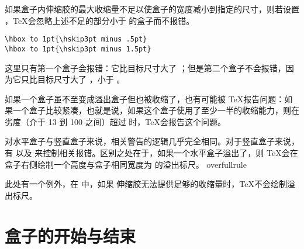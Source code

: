 \documentclass{book}
\begin{document}
\begin{example}
如果盒子内伸缩胶的最大收缩量不足以使盒子的宽度减小到指定的尺寸，则若设置 \emph{}，\TeX 会忽略上述不足的部分小于 \n{1pt} 的盒子而不报错。
\begin{verbatim}
\hbox to 1pt{\hskip3pt minus .5pt}
\hbox to 1pt{\hskip3pt minus 1.5pt}
\end{verbatim}
这里只有第一个盒子会报错：它比目标尺寸大了 \n{1.5pt}；但是第二个盒子不会报错，因为它只比目标尺寸大了 \n{0.5pt}，小于 \emph{}。
\end{example}

如果一个盒子虽不至变成溢出盒子但也被收缩了，也有可能被 \TeX 报告问题：如果一个盒子比较紧凑，也就是说，如果这个盒子使用了至少一半的收缩能力，则在劣度（介于 13 到 100 之间）超过  时，\TeX 会报告这个问题。

对水平盒子与竖直盒子来说，相关警告的逻辑几乎完全相同。对于竖直盒子来说，有  以及  来控制相关报错。区别之处在于，如果一个水平盒子溢出了，则 \TeX 会在盒子右侧绘制一个高度与盒子相同宽度为  的溢出标尺。%
\cstoidx overfullrule\par
此处有一个例外，在  中，如果  伸缩胶无法提供足够的收缩量时，\TeX 不会绘制溢出标尺。

\section{盒子的开始与结束}
\end{document}
